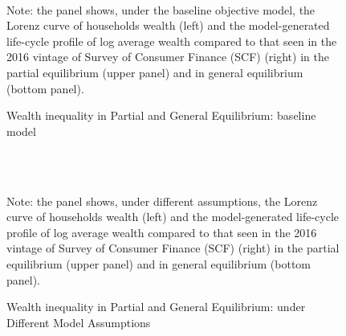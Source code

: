 \clearpage


\begin{figure}[!ht]
	\caption{Wealth inequality in Partial and General Equilibrium: baseline model}
	\label{fig:StE_dist_objective}
	\begin{center}
	 \\
		
	
\end{center}
\begin{flushleft}Note: the panel shows, under the baseline objective model, the Lorenz curve of households wealth (left) and the model-generated life-cycle profile of log average wealth compared to that seen in the 2016 vintage of Survey of Consumer Finance (SCF) (right) in the partial equilibrium (upper panel) and in general equilibrium (bottom panel). \end{flushleft}
\end{figure}


\begin{figure}[!ht]
	\caption{Wealth inequality in Partial and General Equilibrium: under Different Model Assumptions}
	\label{fig:StE_dist_compare}
	\begin{center}
	 \\
	 \\
	
\end{center}
\begin{flushleft}Note: the panel shows, under different assumptions, the Lorenz curve of households wealth (left) and the model-generated life-cycle profile of log average wealth compared to that seen in the 2016 vintage of Survey of Consumer Finance (SCF) (right) in the partial equilibrium (upper panel) and in general equilibrium (bottom panel). \end{flushleft}
\end{figure}


